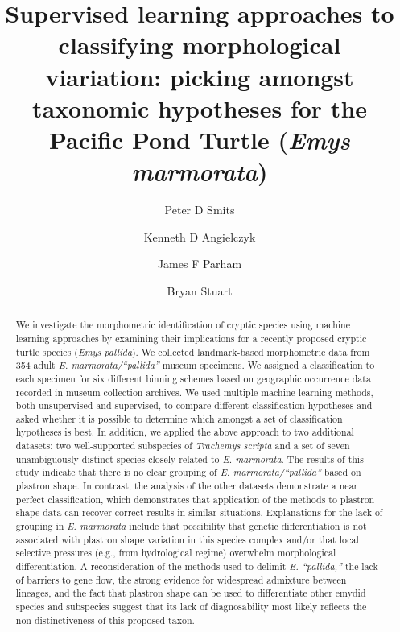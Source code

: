 \documentclass[12pt,letterpaper]{article}
\title{Supervised learning approaches to classifying morphological viariation: picking amongst taxonomic hypotheses for the Pacific Pond Turtle (\textit{Emys marmorata})}
\author[1]{Peter D Smits}%
\author[1,2]{Kenneth D Angielczyk}%
\author[3]{James F Parham}%
\author[4]{Bryan Stuart}%
\affil[1]{Committee on Evolutionary Biology, University of Chicago}
\affil[2]{Integrative Research Center, Field Museum of Natural History}
\affil[3]{Department of Geological Sciences, California State University -- Fullerton}
\affil[4]{Section of Research and Collections, North Carolina Museum of Sciences}
\begin{document}
\maketitle
{}

\linenumbers
\modulolinenumbers[2]

\begin{abstract}
  We investigate the morphometric identification of cryptic species using machine learning approaches by examining their implications for a recently proposed cryptic turtle species (\textit{Emys pallida}). We collected landmark-based morphometric data from 354 adult \textit{E. marmorata/``pallida''} museum specimens. We assigned a classification to each specimen for six different binning schemes based on geographic occurrence data recorded in museum collection archives. We used multiple machine learning methods, both unsupervised and supervised, to compare different classification hypotheses and asked whether it is possible to determine which amongst a set of classification hypotheses is best. 
  In addition, we applied the above approach to two additional datasets: two well-supported subspecies of \textit{Trachemys scripta} and a set of seven unambiguously distinct species closely related to \textit{E. marmorata}. The results of this study indicate that there is no clear grouping of \textit{E. marmorata/``pallida''} based on plastron shape. In contrast, the analysis of the other datasets demonstrate a near perfect classification, which demonstrates that application of the methods to plastron shape data can recover correct results in similar situations. Explanations for the lack of grouping in \textit{E. marmorata} include that possibility that genetic differentiation is not associated with plastron shape variation in this species complex and/or that local selective pressures (e.g., from hydrological regime) overwhelm morphological differentiation. A reconsideration of the methods used to delimit \textit{E. ``pallida,''} the lack of barriers to gene flow, the strong evidence for widespread admixture between lineages, and the fact that plastron shape can be used to differentiate other emydid species and subspecies suggest that its lack of diagnosability most likely reflects the non-distinctiveness of this proposed taxon.
\end{abstract}
\end{document}
